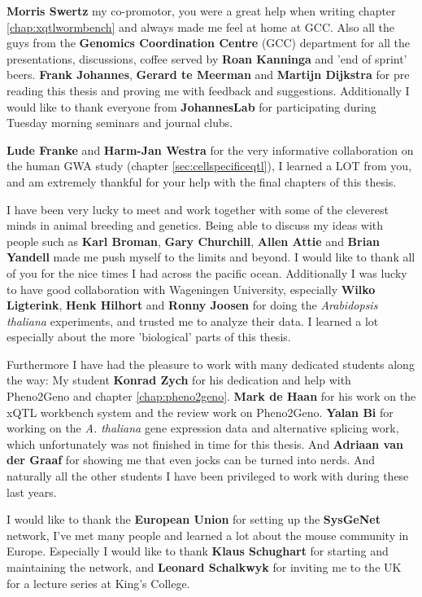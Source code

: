 {\bf Morris Swertz} my co-promotor, you were a great help when writing chapter \ref{chap:xqtlwormbench} 
and always made me feel at home at GCC. Also all the guys from the {\bf Genomics Coordination 
Centre} (GCC) department for all the presentations, discussions, coffee served by {\bf Roan Kanninga} and 'end of sprint' beers. 
{\bf Frank Johannes}, {\bf Gerard te Meerman} and {\bf Martijn Dijkstra} for pre reading this thesis and proving me 
with feedback and suggestions. Additionally I would like to thank everyone from {\bf JohannesLab} for participating during Tuesday morning 
seminars and journal clubs. 

{\bf Lude Franke} and {\bf Harm-Jan Westra} for the very informative collaboration on the 
human GWA study (chapter \ref{sec:cellspecificeqtl}), I learned a LOT from you, and am 
extremely thankful for your help with the final chapters of this thesis. 

I have been very lucky to meet and work together with some of the cleverest minds in animal breeding 
and genetics. Being able to discuss my ideas with people such as {\bf Karl Broman}, {\bf Gary Churchill}, 
{\bf Allen Attie} and {\bf Brian Yandell} made me push myself to the limits and beyond. I would like 
to thank all of you for the nice times I had across the pacific ocean. 
Additionally I was lucky to have good collaboration with Wageningen University, especially {\bf Wilko 
Ligterink}, {\bf Henk Hilhort} and {\bf Ronny Joosen} for doing the \emph{Arabidopsis thaliana} 
experiments, and trusted me to analyze their data. I learned a lot especially about the more 'biological' 
parts of this thesis. 

Furthermore I have had the pleasure to work with many dedicated students along the way: 
My student {\bf Konrad Zych} for his dedication and help with Pheno2Geno and chapter \ref{chap:pheno2geno}. 
{\bf Mark de Haan} for his work on the xQTL workbench system and the review work on Pheno2Geno.
{\bf Yalan Bi} for working on the \emph{A. thaliana} gene expression data and alternative splicing 
work, which unfortunately was not finished in time for this thesis. And {\bf Adriaan van der Graaf} for 
showing me that even jocks can be turned into nerds. And naturally all the other students I have been 
privileged to work with during these last years.

I would like to thank the {\bf European Union} for setting up the {\bf SysGeNet} network, I've met 
many people and learned a lot about the mouse community in Europe. Especially I would like to thank 
{\bf Klaus Schughart} for starting and maintaining the network, and {\bf Leonard Schalkwyk} for 
inviting me to the UK for a lecture series at King's College.

